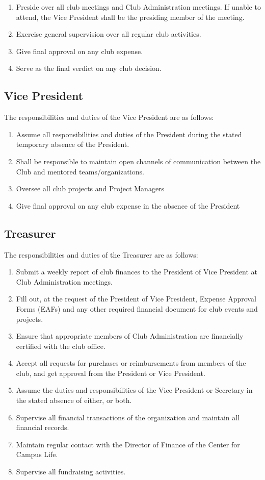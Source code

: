 \documentclass[english,11pt]{article}
\begin{document}
\begin{enumerate}[label=\Alph*.]
\item Preside over all club meetings and Club Administration meetings. If unable to attend, the Vice President shall be the presiding member of the meeting.
\item Exercise general supervision over all regular club activities.
\item Give final approval on any club expense.
\item Serve as the final verdict on any club decision.
\end{enumerate}

\subsection{Vice President}
The responsibilities and duties of the Vice President are as follows:

\begin{enumerate}[label=\Alph*.]	
\item Assume all responsibilities and duties of the President during the stated temporary absence of the President.
\item Shall be responsible to maintain open channels of communication between the Club and mentored teams/organizations.
\item Oversee all club projects and Project Managers
\item Give final approval on any club expense in the absence of the President
\end{enumerate}

\subsection{Treasurer}
The responsibilities and duties of the Treasurer are as follows:

\begin{enumerate}[label=\Alph*.]
\item Submit a weekly report of club finances to the President of Vice President at Club Administration meetings.
\item Fill out, at the request of the President of Vice President, Expense Approval Forms (EAFs) and any other required financial document for club events and projects.
\item Ensure that appropriate members of Club Administration are financially certified with the club office.
\item Accept all requests for purchases or reimbursements from members of the club, and get approval from the President or Vice President.
\item Assume the duties and responsibilities of the Vice President or Secretary in the stated absence of either, or both.
\item Supervise all financial transactions of the organization and maintain all financial records.
\item Maintain regular contact with the Director of Finance of the Center for Campus Life.
\item Supervise all fundraising activities.
\end{enumerate}
\end{document}
